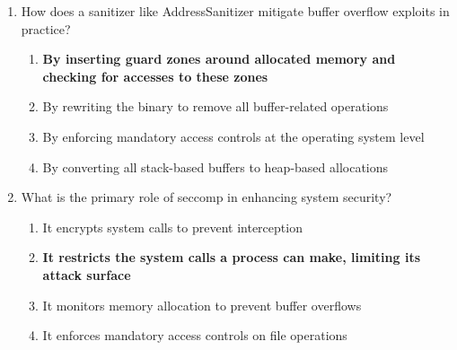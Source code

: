 \begin{enumerate}
    \item How does a sanitizer like AddressSanitizer mitigate buffer overflow
          exploits in practice?
    \begin{enumerate}
        \item \textbf{By inserting guard zones around allocated memory and
              checking for accesses to these zones}
        \item By rewriting the binary to remove all buffer-related operations
        \item By enforcing mandatory access controls at the operating system
              level
        \item By converting all stack-based buffers to heap-based allocations
    \end{enumerate}

    \item What is the primary role of seccomp in enhancing system security?
    \begin{enumerate}
        \item It encrypts system calls to prevent interception
        \item \textbf{It restricts the system calls a process can make, limiting
              its attack surface}
        \item It monitors memory allocation to prevent buffer overflows
        \item It enforces mandatory access controls on file operations
    \end{enumerate}
\end{enumerate}

